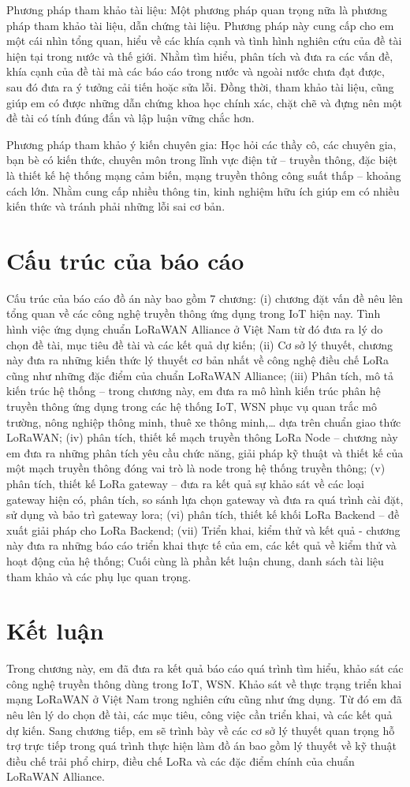 Phương pháp tham khảo tài liệu: Một phương pháp quan trọng nữa là phương pháp tham khảo tài liệu, dẫn chứng tài liệu. Phương pháp này cung cấp cho em một cái nhìn tổng quan, hiểu về các khía cạnh và tình hình nghiên cứu của đề tài hiện tại trong nước và thế giới. Nhằm tìm hiểu, phân tích và đưa ra các vấn đề, khía cạnh của đề tài mà các báo cáo trong nước và ngoài nước chưa đạt được, sau đó đưa ra ý tưởng cải tiến hoặc sửa lỗi. Đồng thời, tham khảo tài liệu, cũng giúp em có được những dẫn chứng khoa học chính xác, chặt chẽ và đựng nên một đề tài có tính đúng đắn và lập luận vững chắc hơn.  \par
Phương pháp tham khảo ý kiến chuyên gia: Học hỏi các thầy cô, các chuyên gia, bạn bè có kiến thức, chuyên môn trong lĩnh vực điện tử – truyền thông, đặc biệt là thiết kế hệ thống mạng cảm biến, mạng truyền thông công suất thấp – khoảng cách lớn. Nhằm cung cấp nhiều thông tin, kinh nghiệm hữu ích giúp em có nhiều kiến thức và tránh phải những lỗi sai cơ bản.  

\section{Cấu trúc của báo cáo}
Cấu trúc của báo cáo đồ án này bao gồm 7 chương: (i) chương đặt vấn đề nêu lên tổng quan về các công nghệ truyền thông ứng dụng trong IoT hiện nay. Tình hình việc ứng dụng chuẩn LoRaWAN Alliance ở Việt Nam từ đó đưa ra lý do chọn đề tài, mục tiêu đề tài và các kết quả dự kiến; (ii) Cơ sở lý thuyết, chương này đưa ra những kiến thức lý thuyết cơ bản nhất về công nghệ điều chế LoRa cũng như những đặc điểm của chuẩn LoRaWAN Alliance; (iii) Phân tích, mô tả kiến trúc hệ thống – trong chương này, em đưa ra mô hình kiến trúc phân hệ truyền thông ứng dụng trong các hệ thống IoT, WSN phục vụ quan trắc mô trường, nông nghiệp thông minh, thuê xe thông minh,… dựa trên chuẩn giao thức LoRaWAN; (iv) phân tích, thiết kế mạch truyền thông LoRa Node – chương này em đưa ra những phân tích yêu cầu chức năng, giải pháp kỹ thuật và thiết kế của một mạch truyền thông đóng vai trò là node trong hệ thống truyền thông; (v) phân tích, thiết kế LoRa gateway – đưa ra kết quả sự khảo sát về các loại gateway hiện có, phân tích, so sánh lựa chọn gateway và đưa ra quá trình cài đặt, sử dụng và bảo trì gateway lora; (vi) phân tích, thiết kế khối LoRa Backend – đề xuất giải pháp cho LoRa Backend; (vii) Triển khai, kiểm thử và kết quả - chương này đưa ra những báo cáo triển khai thực tế của em, các kết quả về kiểm thử và hoạt động của hệ thống; Cuối cùng là phần kết luận chung, danh sách tài liệu tham khảo và các phụ lục quan trọng. 
\section{Kết luận}
Trong chương này, em đã đưa ra kết quả báo cáo quá trình tìm hiểu, khảo sát các công nghệ truyền thông dùng trong IoT, WSN. Khảo sát về thực trạng triển khai mạng LoRaWAN ở Việt Nam trong nghiên cứu cũng như ứng dụng. Từ đó em đã nêu lên lý do chọn đề tài, các mục tiêu, công việc cần triển khai, và các kết quả dự kiến. Sang chương tiếp, em sẽ trình bày về các cơ sở lý thuyết quan trọng hỗ trợ trực tiếp trong quá trình thực hiện làm đồ án bao gồm lý thuyết về kỹ thuật điều chế trải phổ chirp, điều chế LoRa và các đặc điểm chính của chuẩn LoRaWAN Alliance. 
